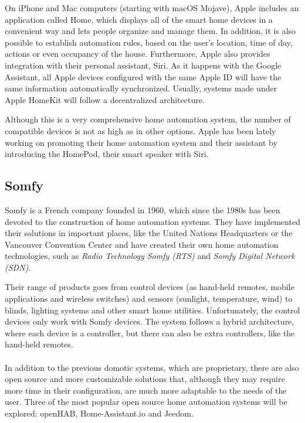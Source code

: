 On iPhone and Mac computers (starting with macOS Mojave), Apple includes an application called Home, which displays all
of the smart home devices in a convenient way and lets people organize and manage them. In addition, it is also possible to establish
automation rules, based on the user's location, time of day, actions or even occupancy of the house. Furthermore, Apple also provides
integration with their personal assistant, Siri. As it happens with the Google Assistant, all Apple devices configured with the same Apple
ID will have the same information automatically synchronized.\cite{appleIOSHome} Usually, systems made under Apple HomeKit will follow
a decentralized architecture.

Although this is a very comprehensive home automation system, the number of compatible devices is not as high as in other options.
Apple has been lately working on promoting their home automation system and their assistant by introducing the HomePod, their smart
speaker with Siri.

\subsection{Somfy}
Somfy is a French company founded in 1960, which since the 1980s has been devoted to the construction of home automation systems.
They have implemented their solutions in important places, like the United Nations Headquarters or the Vancouver Convention Center
and have created their own home automation technologies, such as \textit{Radio Technology Somfy (RTS)} and \textit{Somfy Digital
Network (SDN)}.\cite{somfyOurStory}

Their range of products goes from control devices (as hand-held remotes, mobile applications and wireless switches) and sensors (sunlight,
temperature, wind) to blinds, lighting systems and other smart home utilities. Unfortunately, the control devices only work with Somfy
devices. The system follows a hybrid architecture, where each device is a controller, but there can also be extra controllers, like the
hand-held remotes.
\\~\\

In addition to the previous domotic systems, which are proprietary, there are also open source and more customizable solutions that,
although they may require more time in their configuration, are much more adaptable to the needs of the user. Three of the most popular
open source home automation systems will be explored: openHAB, Home-Assistant.io and Jeedom.

